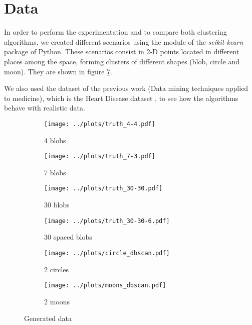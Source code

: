 \section{Data}
\label{sec:data}
In order to perform the experimentation and to compare both clustering algorithms, we created different scenarios using the module  of the \textit{scikit-kearn} \cite{scikit-learn} package of Python. These scenarios consist in 2-D points located in different places among the space, forming clusters of different shapes (blob, circle and moon). They are shown in figure \ref{fig:truth-data}. 

We also used the dataset of the previous work (Data mining techniques applied to medicine), which is the Heart Disease dataset \cite{heart}, to see how the algorithms behave with realistic data.

\begin{figure}[hbtp]
    \begin{subfigure}[b]{0.45\columnwidth}
        \texttt{[image: ../plots/truth\_4-4.pdf]}
        \caption{4 blobs}
        \label{subfig:4-4-truth}
    \end{subfigure}
    \hspace{0.04\columnwidth}
    \begin{subfigure}[b]{0.45\columnwidth}
        \texttt{[image: ../plots/truth\_7-3.pdf]}
        \caption{7 blobs}
        \label{subfig:7-3-truth}
    \end{subfigure}
    \begin{subfigure}[b]{0.45\columnwidth}
        \texttt{[image: ../plots/truth\_30-30.pdf]}
        \caption{30 blobs}
        \label{subfig:30-30-truth}
    \end{subfigure}
    \hspace{0.04\columnwidth}
    \begin{subfigure}[b]{0.45\columnwidth}
        \texttt{[image: ../plots/truth\_30-30-6.pdf]}
        \caption{30 spaced blobs}
        \label{subfig:30-30-6-truth}
    \end{subfigure}
    \begin{subfigure}[b]{0.45\columnwidth}
        \texttt{[image: ../plots/circle\_dbscan.pdf]}
        \caption{2 circles}
        \label{subfig:circle-truth}
    \end{subfigure}
    \hspace{0.04\columnwidth}
    \begin{subfigure}[b]{0.45\columnwidth}
        \texttt{[image: ../plots/moons\_dbscan.pdf]}
        \caption{2 moons}
        \label{subfig:moons-truth}
    \end{subfigure}
    \caption{Generated data}
    \label{fig:truth-data}
\end{figure}

